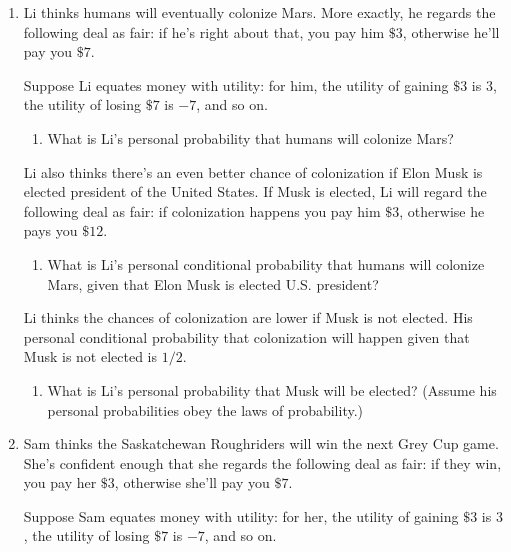 \documentclass[justified]{tufte-book}
\providecommand{\tightlist}{%
  \setlength{\itemsep}{0pt}\setlength{\parskip}{0pt}}
\theoremstyle{definition}
\theoremstyle{definition}
\theoremstyle{definition}
\theoremstyle{remark}
\begin{document}
\begin{enumerate}
\item
  Li thinks humans will eventually colonize Mars. More exactly, he
  regards the following deal as fair: if he's right about that, you pay
  him \(\$3\), otherwise he'll pay you \(\$7\).

  Suppose Li equates money with utility: for him, the utility of gaining
  \(\$3\) is \(3\), the utility of losing \(\$7\) is \(-7\), and so on.

  \begin{enumerate}
  \def\labelenumii{\alph{enumii}.}
  \tightlist
  \item
    What is Li's personal probability that humans will colonize Mars?
  \end{enumerate}

  Li also thinks there's an even better chance of colonization if Elon
  Musk is elected president of the United States. If Musk is elected, Li
  will regard the following deal as fair: if colonization happens you
  pay him \(\$3\), otherwise he pays you \(\$12\).

  \begin{enumerate}
  \def\labelenumii{\alph{enumii}.}
  \setcounter{enumii}{1}
  \tightlist
  \item
    What is Li's personal conditional probability that humans will
    colonize Mars, given that Elon Musk is elected U.S. president?
  \end{enumerate}

  Li thinks the chances of colonization are lower if Musk is not
  elected. His personal conditional probability that colonization will
  happen given that Musk is not elected is \(1/2\).

  \begin{enumerate}
  \def\labelenumii{\alph{enumii}.}
  \setcounter{enumii}{2}
  \tightlist
  \item
    What is Li's personal probability that Musk will be elected? (Assume
    his personal probabilities obey the laws of probability.)
  \end{enumerate}
\item
  Sam thinks the Saskatchewan Roughriders will win the next Grey Cup
  game. She's confident enough that she regards the following deal as
  fair: if they win, you pay her \(\$3\), otherwise she'll pay you
  \(\$7\).

  Suppose Sam equates money with utility: for her, the utility of
  gaining \(\$3\) is \(3\), the utility of losing \(\$7\) is \(-7\), and
  so on.


\end{enumerate}
\end{document}
